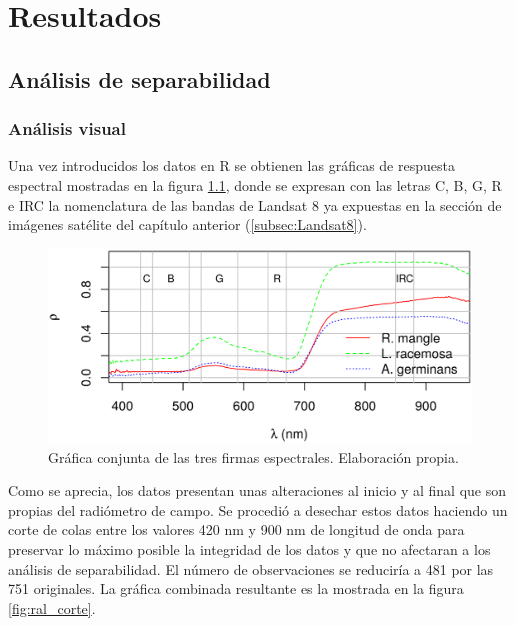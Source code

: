 


\chapter{Resultados}
\label{cap:resultados}

\section{Análisis de separabilidad}
\subsection{Análisis visual}
Una vez introducidos los datos en R se obtienen las gráficas de respuesta espectral mostradas en la figura \ref{fig:ral}, donde se expresan con las letras C, B, G, R e IRC la nomenclatura de las bandas de Landsat 8 ya expuestas en la sección de imágenes satélite del capítulo anterior (\ref{subsec:Landsat8}).%


\begin{figure}
	\centering
	\includegraphics[width=0.8\linewidth]{./Imagenes/ral2.eps}
	\caption[Firmas espectrales de las tres especies]{Gráfica conjunta de las tres firmas espectrales. Elaboración propia.}
	\label{fig:ral}
\end{figure}

Como se aprecia, los datos presentan unas alteraciones al inicio y al final que son propias del radiómetro de campo. Se procedió a desechar estos datos haciendo un corte de colas entre los valores 420 nm y 900 nm de longitud de onda para preservar lo máximo posible la integridad de los datos y que no afectaran a los análisis de separabilidad. El número de observaciones se reduciría a 481 por las 751 originales. La gráfica combinada resultante es la mostrada en la figura \ref{fig:ral_corte}.%

